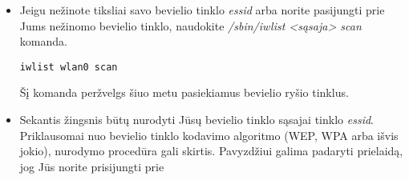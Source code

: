 \begin{itemize}
    \item Jeigu nežinote tiksliai savo bevielio tinklo \textsl{essid}
      arba norite pasijungti prie Jums nežinomo bevielio tinklo,
      naudokite \textsl{/sbin/iwlist <sąsaja> scan} komanda. 
\begin{verbatim}
iwlist wlan0 scan
\end{verbatim}
      Šį komanda peržvelgs šiuo metu pasiekiamus bevielio ryšio
      tinklus.
    \item Sekantis žingsnis būtų nurodyti Jūsų bevielio tinklo sąsajai
      tinklo \textsl{essid}. Priklausomai nuo bevielio tinklo kodavimo
      algoritmo (WEP, WPA arba išvis jokio), nurodymo procedūra gali
      skirtis. Pavyzdžiui galima padaryti prielaidą, jog Jūs norite
      prisijungti prie \textsl{}
      
  \end{itemize}
